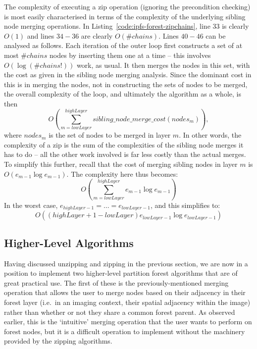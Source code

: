 The complexity of executing a zip operation (ignoring the precondition checking) is most easily characterised in terms of the complexity of the underlying sibling node merging operations. In Listing~\ref{code:ipfs-forest-zipchains}, line $33$ is clearly $O(1)$ and lines $34-36$ are clearly $O(\#\mathit{chains})$. Lines $40-46$ can be analysed as follows. Each iteration of the outer loop first constructs a set of at most $\#\mathit{chains}$ nodes by inserting them one at a time -- this involves $O(\log(\#\mathit{chains}!))$ work, as usual. It then merges the nodes in this set, with the cost as given in the sibling node merging analysis. Since the dominant cost in this is in merging the nodes, not in constructing the sets of nodes to be merged, the overall complexity of the loop, and ultimately the algorithm as a whole, is then
%
\[
O\left( \sum_{m=\mathit{lowLayer}}^{\mathit{highLayer}} \mathit{sibling\_node\_merge\_cost}(\mathit{nodes}_m) \right),
\]
%
where $\mathit{nodes}_m$ is the set of nodes to be merged in layer $m$. In other words, the complexity of a zip is the sum of the complexities of the sibling node merges it has to do -- all the other work involved is far less costly than the actual merges. To simplify this further, recall that the cost of merging sibling nodes in layer $m$ is $O(e_{m-1} \log e_{m-1})$. The complexity here thus becomes:
%
\[
O\left( \sum_{m=\mathit{lowLayer}}^{\mathit{highLayer}} e_{m-1} \log e_{m-1} \right)
\]
%
In the worst case, $e_{\mathit{highLayer}-1} = \ldots = e_{\mathit{lowLayer}-1}$, and this simplifies to:
%
\[
O((highLayer+1-lowLayer) e_{\mathit{lowLayer}-1} \log e_{\mathit{lowLayer}-1})
\]

\afterpage{\clearpage}
\newpage

\subsection{Higher-Level Algorithms}

Having discussed unzipping and zipping in the previous section, we are now in a position to implement two higher-level partition forest algorithms that are of great practical use. The first of these is the previously-mentioned merging operation that allows the user to merge nodes based on their adjacency in their forest layer (i.e.~in an imaging context, their spatial adjacency within the image) rather than whether or not they share a common forest parent. As observed earlier, this is the `intuitive' merging operation that the user wants to perform on forest nodes, but it is a difficult operation to implement without the machinery provided by the zipping algorithms.

